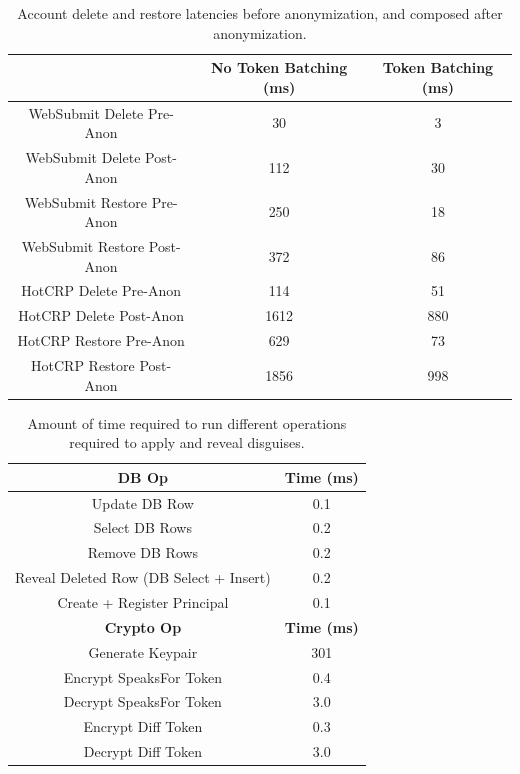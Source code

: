 \begin{table}[t!]
\begin{center}
\begin{tabular}{ c | c c }
\hline
& No Token Batching (ms) & Token Batching (ms) \\
\hline
    WebSubmit Delete Pre-Anon & 30 & 3 \\
    WebSubmit Delete Post-Anon & 112 & 30 \\
    WebSubmit Restore Pre-Anon & 250 & 18 \\
    WebSubmit Restore Post-Anon & 372 & 86 \\
    HotCRP Delete Pre-Anon & 114 & 51 \\
    HotCRP Delete Post-Anon & 1612 & 880 \\
    HotCRP Restore Pre-Anon & 629 & 73 \\
    HotCRP Restore Post-Anon & 1856 & 998 
\end{tabular}
\end{center}
\caption{Account delete and restore latencies before anonymization, and composed after anonymization.}
\label{tab:composition}
\end{table}

\begin{table}[h!]
\begin{center}
\begin{tabular}{ c c }
\hline
\textbf{DB Op} & \textbf{Time (ms)}\\
\hline
Update DB Row & 0.1\\ 
Select DB Rows & 0.2\\
Remove DB Rows & 0.2\\
Reveal Deleted Row (DB Select + Insert) & 0.2 \\
Create + Register Principal & 0.1\\
\hline
\textbf{Crypto Op} & \textbf{Time (ms)}\\
\hline
Generate Keypair & 301\\
Encrypt SpeaksFor Token & 0.4\\
Decrypt SpeaksFor Token & 3.0\\
Encrypt Diff Token & 0.3\\
Decrypt Diff Token & 3.0\\
\end{tabular}
\end{center}
\caption{Amount of time required to run different operations required to apply and reveal disguises.}
\label{tab:opstats}
\end{table}

